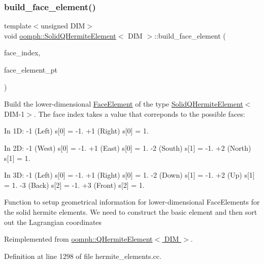 \subsubsection{\texorpdfstring{build\+\_\+face\+\_\+element()}{build\_face\_element()}}
{\footnotesize\ttfamily template$<$unsigned D\+IM$>$ \\
void \hyperlink{classoomph_1_1SolidQHermiteElement}{oomph\+::\+Solid\+Q\+Hermite\+Element}$<$ D\+IM $>$\+::build\+\_\+face\+\_\+element (\begin{DoxyParamCaption}\item[{const int \&}]{face\+\_\+index,  }\item[{\hyperlink{classoomph_1_1FaceElement}{Face\+Element} $\ast$}]{face\+\_\+element\+\_\+pt }\end{DoxyParamCaption})\hspace{0.3cm}{\ttfamily [virtual]}}



Build the lower-\/dimensional \hyperlink{classoomph_1_1FaceElement}{Face\+Element} of the type \hyperlink{classoomph_1_1SolidQHermiteElement}{Solid\+Q\+Hermite\+Element}$<$D\+I\+M-\/1$>$. The face index takes a value that correponds to the possible faces\+: 

In 1D\+: -\/1 (Left) s\mbox{[}0\mbox{]} = -\/1. +1 (Right) s\mbox{[}0\mbox{]} = 1.

In 2D\+: -\/1 (West) s\mbox{[}0\mbox{]} = -\/1. +1 (East) s\mbox{[}0\mbox{]} = 1. -\/2 (South) s\mbox{[}1\mbox{]} = -\/1. +2 (North) s\mbox{[}1\mbox{]} = 1.

In 3D\+: -\/1 (Left) s\mbox{[}0\mbox{]} = -\/1. +1 (Right) s\mbox{[}0\mbox{]} = 1. -\/2 (Down) s\mbox{[}1\mbox{]} = -\/1. +2 (Up) s\mbox{[}1\mbox{]} = 1. -\/3 (Back) s\mbox{[}2\mbox{]} = -\/1. +3 (Front) s\mbox{[}2\mbox{]} = 1.

Function to setup geometrical information for lower-\/dimensional Face\+Elements for the solid hermite elements. We need to construct the basic element and then sort out the Lagrangian coordinates 

Reimplemented from \hyperlink{classoomph_1_1QHermiteElement_a796c8d180b039c5e753b373ba7aa720a}{oomph\+::\+Q\+Hermite\+Element$<$ D\+I\+M $>$}.



Definition at line 1298 of file hermite\+\_\+elements.\+cc.

\mbox{\label{classoomph_1_1SolidQHermiteElement_ad346e3c85d0b563531d7562e0436352c}} 
